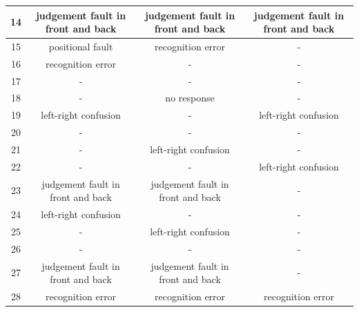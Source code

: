 \documentclass[twocolumn,11pt]{report}
\begin{document}
\begin{table}[ht]
{\begin{tabular}{|c|c|c|c|}
    14              & judgement fault in front and back & judgement fault in front and back & judgement fault in front and back \\ \hline
    15              & positional fault                  & recognition error                 & -                                 \\ \hline
    16              & recognition error                 & -                                 & -                                 \\ \hline
    17              & -                                 & -                                 & -                                 \\ \hline
    18              & -                                 & no response                       & -                                 \\ \hline
    19              & left-right confusion              & -                                 & left-right confusion              \\ \hline
    20              & -                                 & -                                 & -                                 \\ \hline
    21              & -                                 & left-right confusion              & -                                 \\ \hline
    22              & -                                 & -                                 & left-right confusion              \\ \hline
    23              & judgement fault in front and back & judgement fault in front and back & -                                 \\ \hline
    24              & left-right confusion              & -                                 & -                                 \\ \hline
    25              & -                                 & left-right confusion              & -                                 \\ \hline
    26              & -                                 & -                                 & -                                 \\ \hline
    27              & judgement fault in front and back & judgement fault in front and back & -                                 \\ \hline
    28              & recognition error                 & recognition error                 & recognition error                 \\ \hline

\end{tabular}}
\end{table}
\end{document}
